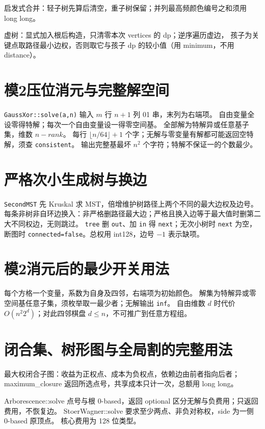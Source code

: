 启发式合并：轻子树先算后清空，重子树保留；并列最高频颜色编号之和须用 long long。

虚树：显式加入根后构造，只清零本次 vertices 的 dp；逆序遍历虚边，
孩子为关键点取路径最小边权，否则取它与孩子 dp 的较小值（用 minimum，不用 distance）。
\section{模2压位消元与完整解空间}\label{knowledge-gauss-xor}
\texttt{GaussXor::solve(a,n)} 输入 $m$ 行 $n+1$ 列 01 串，末列为右端项。
自由变量全设零得特解；每次一个自由变量设一得零空间基。
全部解为特解异或任意基子集，维数 $n-rank$。
每行 $\lfloor n/64\rfloor+1$ 个字；无解与零变量有解都可能返回空特解，须查 \texttt{consistent}。
输出完整基最坏 $n^2$ 个字符；特解不保证一的个数最少。
\section{严格次小生成树与换边}\label{knowledge-second-mst}
\texttt{SecondMST} 先 Kruskal 求 MST，倍增维护树路径上两个不同的最大边权及边号。
每条非树非自环边换入：非严格删路径最大边；严格且换入边等于最大值时删第二大不同权边，无则跳过。
\texttt{tree} 删 \texttt{out}、加 \texttt{in} 得 \texttt{next}；无次小树时 \texttt{next} 为空，
断图时 \texttt{connected=false}。总权用 int128，边号 $-1$ 表示缺项。
\section{模2消元后的最少开关用法}\label{knowledge-switch-min}
每个方格一个变量，系数为自身及四邻，右端项为初始颜色。
解集为特解异或零空间基任意子集，须枚举取一最少者；无解输出 \texttt{inf}。
自由维数 $d$ 时代价 $O(n^2 2^d)$；对此四邻棋盘 $d\le n$，不可推广到任意方程组。


\Needspace{360pt}
\section{闭合集、树形图与全局割的完整用法}\label{knowledge-closure-cuts}
最大权闭合子图：收益为正权点、成本为负权点，依赖边由前者指向后者；
maximum\_closure 返回所选点号，共享成本只计一次，总额用 long long。

Arborescence::solve 点号与根 0-based，返回 optional 区分无解与负费用；只返回费用，不恢复边。
StoerWagner::solve 要求至少两点、非负对称权，side 为一侧 0-based 原顶点。
核心费用为 128 位类型。
